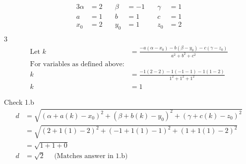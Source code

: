 \documentclass{article}
\begin{document}
\begin{alignat*}{3}
\alpha &= 2	\quad & \beta &= -1	\quad & \gamma &= 1 \\
a &= 1		\quad & b &= 1		\quad & c &= 1\\
x_0 &= 2		\quad & y_0 &= 1	\quad & z_0 &= 2\\
\end{alignat*}{3}
\begin{align*}
\text{Let } k &= \frac{-a(\alpha - x_0) - b(\beta - y_0) - c(\gamma - z_0)}{a^2+b^2+c^2} \\
\text{For variables as defined above:} \\
k &= \frac{-1(2-2) - 1(-1-1) - 1(1-2)}{1^2 + 1^2 + 1^2} \\
k &= 1
\end{align*}

Check 1.b
\begin{align*}
d &= \sqrt{(\alpha + a(k) - x_0)^2 + (\beta + b(k) - y_0)^2 + (\gamma + c(k) - z_0)^2} \\
&= \sqrt{(2 + 1(1) - 2)^2 + (-1 + 1(1) - 1)^2 + (1 + 1(1) - 2)^2} \\
&= \sqrt{1 + 1 + 0} \\
d &= \sqrt{2} \quad \text{ (Matches answer in 1.b)}
\end{align*}
\end{document}
